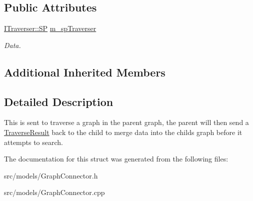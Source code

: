 \subsection*{Public Attributes}
\begin{DoxyCompactItemize}
\item 
\mbox{\label{struct_graph_connector_1_1_traverse_request_a13d442df81fd00f9fe28d4d4fcc448e0}} 
\hyperlink{class_i_graph_1_1_i_traverser_a5a5ccc81423d6024742d1898a310d812}{I\+Traverser\+::\+SP} \hyperlink{struct_graph_connector_1_1_traverse_request_a13d442df81fd00f9fe28d4d4fcc448e0}{m\+\_\+sp\+Traverser}
\begin{DoxyCompactList}\small\item\em Data. \end{DoxyCompactList}\end{DoxyCompactItemize}
\subsection*{Additional Inherited Members}


\subsection{Detailed Description}
This is sent to traverse a graph in the parent graph, the parent will then send a \hyperlink{struct_graph_connector_1_1_traverse_result}{Traverse\+Result} back to the child to merge data into the child\textquotesingle{}s graph before it attempts to search. 

The documentation for this struct was generated from the following files\+:\begin{DoxyCompactItemize}
\item 
src/models/Graph\+Connector.\+h\item 
src/models/Graph\+Connector.\+cpp\end{DoxyCompactItemize}
